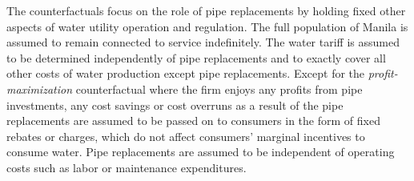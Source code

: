\documentclass[12pt,table]{article}
\begin{document}
The counterfactuals focus on the role of pipe replacements by holding fixed other aspects of water utility operation and regulation.  The full population of Manila is assumed to remain connected to service indefinitely.  The water tariff is assumed to be determined independently of pipe replacements and to exactly cover all other costs of water production except pipe replacements.  Except for the \textit{profit-maximization} counterfactual where the firm enjoys any profits from pipe investments, any cost savings or cost overruns as a result of the pipe replacements are assumed to be passed on to consumers in the form of fixed rebates or charges, which do not affect consumers' marginal incentives to consume water.  Pipe replacements are assumed to be independent of operating costs such as labor or maintenance expenditures.



\end{document}
